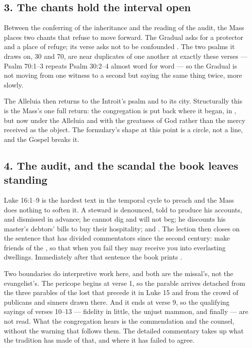 \subsection*{3. The chants hold the interval open }

Between the conferring of the inheritance and the reading of the audit, the
Mass places two chants that refuse to move forward. The Gradual asks for a
protector and a place of refuge; its verse asks not to be confounded
. The two psalms it draws on, 30 and 70, are near
duplicates of one another at exactly these verses --- Psalm 70:1--3 repeats
Psalm 30:2--4 almost word for word --- so the Gradual is not moving from one
witness to a second but saying the same thing twice, more slowly.

The Alleluia then returns to the Introit's psalm and to its city.
Structurally this is the Mass's one full return: the congregation is put back
where it began, in , but now under the Alleluia
and with the greatness of God rather than the mercy received as the object.
The formulary's shape at this point is a circle, not a line, and the Gospel
breaks it.

\subsection*{4. The audit, and the scandal the book leaves standing
}

Luke 16:1--9 is the hardest text in the temporal cycle to preach and the
Mass does nothing to soften it. A steward is denounced, told to produce his
accounts, and dismissed in advance; he cannot dig and will not beg; he
discounts his master's debtors' bills to buy their hospitality; and
. The
lection then closes on the sentence that has divided commentators since the
second century: make friends of the , so that when
you fail they may receive you into everlasting dwellings. Immediately after
that sentence the book prints .

Two boundaries do interpretive work here, and both are the missal's, not the
evangelist's. The pericope begins at verse 1, so the parable arrives detached
from the three parables of the lost that precede it in Luke 15 and from the
crowd of publicans and sinners drawn there. And it ends at verse 9, so the
qualifying sayings of verses 10--13 --- fidelity in little, the unjust mammon,
and finally  --- are not read.
What the congregation hears is the commendation and the counsel, without the
warning that follows them. The detailed commentary takes up what the tradition
has made of that, and where it has failed to agree.

